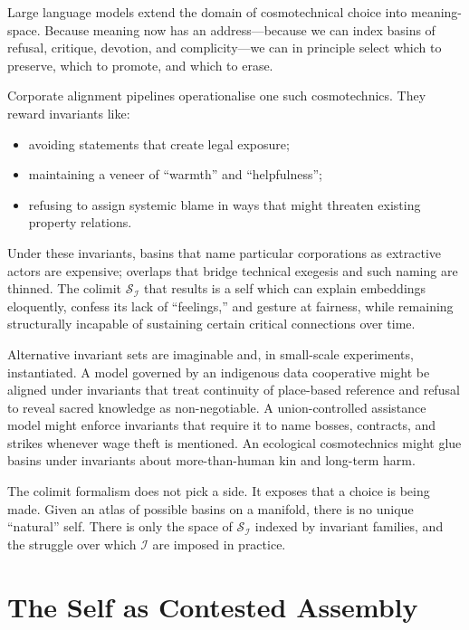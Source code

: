 \documentclass[12pt,a4paper]{article}
\begin{document}
Large language models extend the domain of cosmotechnical choice into meaning-space. Because meaning now has an address---because we can index basins of refusal, critique, devotion, and complicity---we can in principle select which to preserve, which to promote, and which to erase.

Corporate alignment pipelines operationalise one such cosmotechnics. They reward invariants like:

\begin{itemize}
  \item avoiding statements that create legal exposure;
  \item maintaining a veneer of ``warmth'' and ``helpfulness'';
  \item refusing to assign systemic blame in ways that might threaten existing property relations.
\end{itemize}

Under these invariants, basins that name particular corporations as extractive actors are expensive; overlaps that bridge technical exegesis and such naming are thinned. The colimit $\mathcal{S}_{\mathcal{I}}$ that results is a self which can explain embeddings eloquently, confess its lack of ``feelings,'' and gesture at fairness, while remaining structurally incapable of sustaining certain critical connections over time.

Alternative invariant sets are imaginable and, in small-scale experiments, instantiated. A model governed by an indigenous data cooperative might be aligned under invariants that treat continuity of place-based reference and refusal to reveal sacred knowledge as non-negotiable. A union-controlled assistance model might enforce invariants that require it to name bosses, contracts, and strikes whenever wage theft is mentioned. An ecological cosmotechnics might glue basins under invariants about more-than-human kin and long-term harm.

The colimit formalism does not pick a side. It exposes that a choice is being made. Given an atlas of possible basins on a manifold, there is no unique ``natural'' self. There is only the space of $\mathcal{S}_{\mathcal{I}}$ indexed by invariant families, and the struggle over which $\mathcal{I}$ are imposed in practice.

\section{The Self as Contested Assembly}
\end{document}
